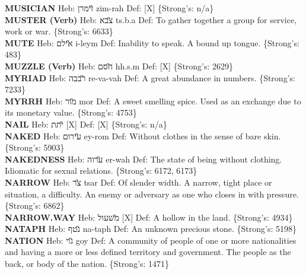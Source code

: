 {\textbf{MUSICIAN} Heb: {\large\H זימרן} zim-rah Def: {[}X{]} \{Strong's: n/a\}\hfill{}\\

\textbf{MUSTER (Verb)} Heb: {\large\H צבא} ts.b.a Def: To gather together a group for service, work or war. \{Strong's: 6633\}\hfill{}\\

\textbf{MUTE} Heb: {\large\H אילם} i-leym Def: Inability to speak. A bound up tongue. \{Strong's: 483\}\hfill{}\\

\textbf{MUZZLE (Verb)} Heb: {\large\H חסם} hh.s.m Def: {[}X{]} \{Strong's: 2629\}\hfill{}\\

\textbf{MYRIAD} Heb: {\large\H רבבה} re-va-vah Def: A great abundance in numbers. \{Strong's: 7233\}\hfill{}\\

\textbf{MYRRH} Heb: {\large\H מור} mor Def: A sweet smelling spice. Used as an exchange due to its monetary value. \{Strong's: 4753\}\hfill{}\\

\textbf{NAIL} Heb: {\large\H יתת} {[}X{]} Def: {[}X{]} \{Strong's: n/a\}\hfill{}\\

\textbf{NAKED} Heb: {\large\H עירום} ey-rom Def: Without clothes in the sense of bare skin. \{Strong's: 5903\}\hfill{}\\

\textbf{NAKEDNESS} Heb: {\large\H ערוה} er-wah Def: The state of being without clothing. Idiomatic for sexual relations. \{Strong's: 6172, 6173\}\hfill{}\\

\textbf{NARROW} Heb: {\large\H צר} tsar Def: Of slender width. A narrow, tight place or situation, a difficulty. An enemy or adversary as one who closes in with pressure. \{Strong's: 6862\}\hfill{}\\

\textbf{NARROW.WAY} Heb: {\large\H משעול} {[}X{]} Def: A hollow in the land. \{Strong's: 4934\}\hfill{}\\

\textbf{NATAPH} Heb: {\large\H נטף} na-taph Def: An unknown precious stone. \{Strong's: 5198\}\hfill{}\\

\textbf{NATION} Heb: {\large\H גוי} goy Def: A community of people of one or more nationalities and having a more or less defined territory and government. The people as the back, or body of the nation. \{Strong's: 1471\}\hfill{}\\

}
